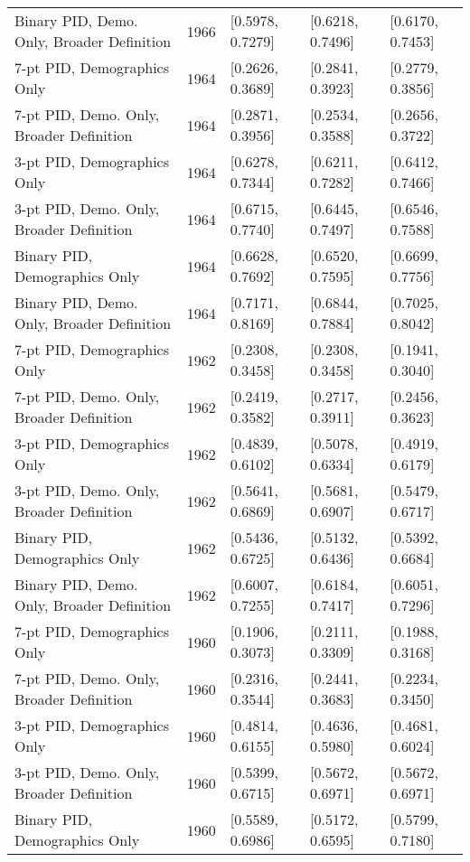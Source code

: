 \begin{longtable}{lrlll}
  Binary PID, Demo. Only, Broader Definition & 1966 & [0.5978, 0.7279] & [0.6218, 0.7496] & [0.6170, 0.7453] \\ 
  7-pt PID, Demographics Only & 1964 & [0.2626, 0.3689] & [0.2841, 0.3923] & [0.2779, 0.3856] \\ 
  7-pt PID, Demo. Only, Broader Definition & 1964 & [0.2871, 0.3956] & [0.2534, 0.3588] & [0.2656, 0.3722] \\ 
  3-pt PID, Demographics Only & 1964 & [0.6278, 0.7344] & [0.6211, 0.7282] & [0.6412, 0.7466] \\ 
  3-pt PID, Demo. Only, Broader Definition & 1964 & [0.6715, 0.7740] & [0.6445, 0.7497] & [0.6546, 0.7588] \\ 
  Binary PID, Demographics Only & 1964 & [0.6628, 0.7692] & [0.6520, 0.7595] & [0.6699, 0.7756] \\ 
  Binary PID, Demo. Only, Broader Definition & 1964 & [0.7171, 0.8169] & [0.6844, 0.7884] & [0.7025, 0.8042] \\ 
  7-pt PID, Demographics Only & 1962 & [0.2308, 0.3458] & [0.2308, 0.3458] & [0.1941, 0.3040] \\ 
  7-pt PID, Demo. Only, Broader Definition & 1962 & [0.2419, 0.3582] & [0.2717, 0.3911] & [0.2456, 0.3623] \\ 
  3-pt PID, Demographics Only & 1962 & [0.4839, 0.6102] & [0.5078, 0.6334] & [0.4919, 0.6179] \\ 
  3-pt PID, Demo. Only, Broader Definition & 1962 & [0.5641, 0.6869] & [0.5681, 0.6907] & [0.5479, 0.6717] \\ 
  Binary PID, Demographics Only & 1962 & [0.5436, 0.6725] & [0.5132, 0.6436] & [0.5392, 0.6684] \\ 
  Binary PID, Demo. Only, Broader Definition & 1962 & [0.6007, 0.7255] & [0.6184, 0.7417] & [0.6051, 0.7296] \\ 
  7-pt PID, Demographics Only & 1960 & [0.1906, 0.3073] & [0.2111, 0.3309] & [0.1988, 0.3168] \\ 
  7-pt PID, Demo. Only, Broader Definition & 1960 & [0.2316, 0.3544] & [0.2441, 0.3683] & [0.2234, 0.3450] \\ 
  3-pt PID, Demographics Only & 1960 & [0.4814, 0.6155] & [0.4636, 0.5980] & [0.4681, 0.6024] \\ 
  3-pt PID, Demo. Only, Broader Definition & 1960 & [0.5399, 0.6715] & [0.5672, 0.6971] & [0.5672, 0.6971] \\ 
  Binary PID, Demographics Only & 1960 & [0.5589, 0.6986] & [0.5172, 0.6595] & [0.5799, 0.7180] \\ 

\end{longtable}

